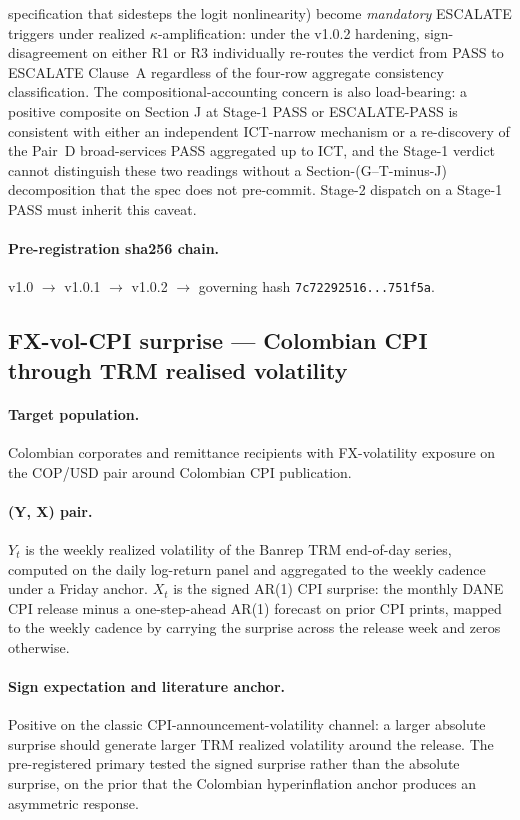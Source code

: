 specification that sidesteps the logit nonlinearity) become
\emph{mandatory} ESCALATE triggers under realized
\(\kappa\)-amplification: under the v1.0.2 hardening, sign-disagreement
on either R1 or R3 individually re-routes the verdict from PASS to
ESCALATE Clause~A regardless of the four-row aggregate consistency
classification. The compositional-accounting concern is also
load-bearing: a positive composite on Section J at Stage-1 PASS or
ESCALATE-PASS is consistent with either an independent ICT-narrow
mechanism or a re-discovery of the Pair~D broad-services PASS
aggregated up to ICT, and the Stage-1 verdict cannot distinguish
these two readings without a Section-(G--T-minus-J) decomposition
that the spec does not pre-commit. Stage-2 dispatch on a Stage-1 PASS
must inherit this caveat.

\paragraph{Pre-registration sha256 chain.} v1.0 \(\to\) v1.0.1
\(\to\) v1.0.2 \(\to\) governing hash
\texttt{7c72292516...751f5a}.

\subsection{FX-vol-CPI surprise --- Colombian CPI through TRM realised
volatility}\label{sec:6.3}

\paragraph{Target population.} Colombian corporates and remittance
recipients with FX-volatility exposure on the COP/USD pair around
Colombian CPI publication.

\paragraph{(Y, X) pair.} \(Y_t\) is the weekly realized volatility of
the Banrep TRM end-of-day series, computed on the daily log-return
panel and aggregated to the weekly cadence under a Friday anchor.
\(X_t\) is the signed AR(1) CPI surprise: the monthly DANE CPI
release minus a one-step-ahead AR(1) forecast on prior CPI prints,
mapped to the weekly cadence by carrying the surprise across the
release week and zeros otherwise.

\paragraph{Sign expectation and literature anchor.} Positive on the
classic CPI-announcement-volatility channel: a larger absolute
surprise should generate larger TRM realized volatility around the
release. The pre-registered primary tested the signed surprise rather
than the absolute surprise, on the prior that the Colombian
hyperinflation anchor produces an asymmetric response.

